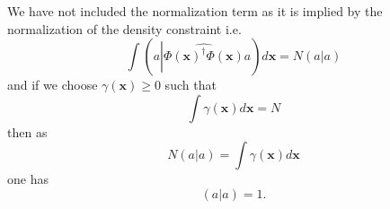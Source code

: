 \documentclass[aps,preprint]{revtex4}%
\begin{document}
We have not included the normalization term as it is implied by the
normalization of the density constraint i.e.
\begin{equation}
\int\left(  a\left\vert \widehat{\Phi\left(  \mathbf{x}\right)  ^{\dagger}%
\Phi\left(  \mathbf{x}\right)  }\right.  a\right)  d\mathbf{x}=N\left(
a\left\vert \overset{}{a}\right.  \right)
\end{equation}
and if we choose $\gamma\left(  \mathbf{x}\right)  \geq0$ such that
\begin{equation}
\int\gamma\left(  \mathbf{x}\right)  d\mathbf{x}=N
\end{equation}
then as
\begin{equation}
N\left(  a\left\vert \overset{}{a}\right.  \right)  =\int\gamma\left(
\mathbf{x}\right)  d\mathbf{x}%
\end{equation}
one has
\begin{equation}
\left(  a\left\vert \overset{}{a}\right.  \right)  =1.
\end{equation}
\end{document}
